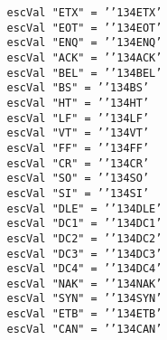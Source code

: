 \mbox{\tt \ \ \ \ \ \ \ \ \ \ \ \ \ \ \ \ escVal\ "ETX"\ =\ '{\char'134}ETX'}\\
\mbox{\tt \ \ \ \ \ \ \ \ \ \ \ \ \ \ \ \ escVal\ "EOT"\ =\ '{\char'134}EOT'}\\
\mbox{\tt \ \ \ \ \ \ \ \ \ \ \ \ \ \ \ \ escVal\ "ENQ"\ =\ '{\char'134}ENQ'}\\
\mbox{\tt \ \ \ \ \ \ \ \ \ \ \ \ \ \ \ \ escVal\ "ACK"\ =\ '{\char'134}ACK'}\\
\mbox{\tt \ \ \ \ \ \ \ \ \ \ \ \ \ \ \ \ escVal\ "BEL"\ =\ '{\char'134}BEL'}\\
\mbox{\tt \ \ \ \ \ \ \ \ \ \ \ \ \ \ \ \ escVal\ "BS"\ =\ '{\char'134}BS'}\\
\mbox{\tt \ \ \ \ \ \ \ \ \ \ \ \ \ \ \ \ escVal\ "HT"\ =\ '{\char'134}HT'}\\
\mbox{\tt \ \ \ \ \ \ \ \ \ \ \ \ \ \ \ \ escVal\ "LF"\ =\ '{\char'134}LF'}\\
\mbox{\tt \ \ \ \ \ \ \ \ \ \ \ \ \ \ \ \ escVal\ "VT"\ =\ '{\char'134}VT'}\\
\mbox{\tt \ \ \ \ \ \ \ \ \ \ \ \ \ \ \ \ escVal\ "FF"\ =\ '{\char'134}FF'}\\
\mbox{\tt \ \ \ \ \ \ \ \ \ \ \ \ \ \ \ \ escVal\ "CR"\ =\ '{\char'134}CR'}\\
\mbox{\tt \ \ \ \ \ \ \ \ \ \ \ \ \ \ \ \ escVal\ "SO"\ =\ '{\char'134}SO'}\\
\mbox{\tt \ \ \ \ \ \ \ \ \ \ \ \ \ \ \ \ escVal\ "SI"\ =\ '{\char'134}SI'}\\
\mbox{\tt \ \ \ \ \ \ \ \ \ \ \ \ \ \ \ \ escVal\ "DLE"\ =\ '{\char'134}DLE'}\\
\mbox{\tt \ \ \ \ \ \ \ \ \ \ \ \ \ \ \ \ escVal\ "DC1"\ =\ '{\char'134}DC1'}\\
\mbox{\tt \ \ \ \ \ \ \ \ \ \ \ \ \ \ \ \ escVal\ "DC2"\ =\ '{\char'134}DC2'}\\
\mbox{\tt \ \ \ \ \ \ \ \ \ \ \ \ \ \ \ \ escVal\ "DC3"\ =\ '{\char'134}DC3'}\\
\mbox{\tt \ \ \ \ \ \ \ \ \ \ \ \ \ \ \ \ escVal\ "DC4"\ =\ '{\char'134}DC4'}
%
\eprogB\noindent\bprogB
\mbox{\tt }\\
\mbox{\tt \ \ \ \ \ \ \ \ \ \ \ \ \ \ \ \ escVal\ "NAK"\ =\ '{\char'134}NAK'}\\
\mbox{\tt \ \ \ \ \ \ \ \ \ \ \ \ \ \ \ \ escVal\ "SYN"\ =\ '{\char'134}SYN'}\\
\mbox{\tt \ \ \ \ \ \ \ \ \ \ \ \ \ \ \ \ escVal\ "ETB"\ =\ '{\char'134}ETB'}\\
\mbox{\tt \ \ \ \ \ \ \ \ \ \ \ \ \ \ \ \ escVal\ "CAN"\ =\ '{\char'134}CAN'}\\
